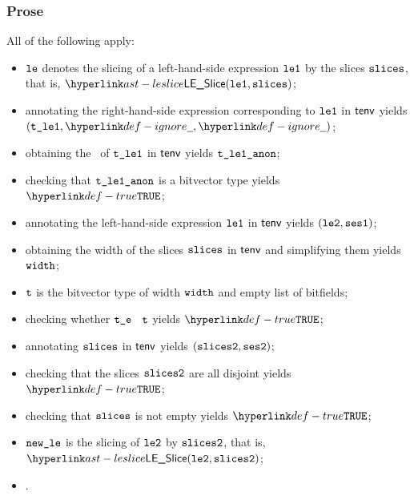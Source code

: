 \subsubsection{Prose}
All of the following apply:
\begin{itemize}
  \item $\texttt{le}$ denotes the slicing of a left-hand-side expression $\texttt{le1}$ by the slices $\texttt{slices}$, that is, $\LESlice(\vleone, \slices)$;
  \item annotating the right-hand-side expression corresponding to $\texttt{le1}$ in $\textsf{tenv}$ yields \\
        $(\vtleone, \Ignore, \Ignore)$\ProseOrTypeError;
  \item obtaining the \underlyingtype\ of $\texttt{t\_le1}$ in $\textsf{tenv}$ yields $\texttt{t\_le1\_anon}$\ProseOrTypeError;
  \item checking that $\texttt{t\_le1\_anon}$ is a bitvector type yields $\True$\ProseTerminateAs{\ExpectedBitvectorType};
  \item annotating the left-hand-side expression $\texttt{le1}$ in $\textsf{tenv}$ yields $(\texttt{le2}, \texttt{ses1})$\ProseOrTypeError;
  \item obtaining the width of the slices $\texttt{slices}$ in $\textsf{tenv}$ and simplifying them yields $\texttt{width}$;
  \item $\texttt{t}$ is the bitvector type of width $\texttt{width}$ and empty list of bitfields;
  \item checking whether $\texttt{t\_e}$ \typesatisfies\ $\texttt{t}$ yields $\True$\ProseOrTypeError;
  \item annotating $\texttt{slices}$ in $\textsf{tenv}$ yields $(\texttt{slices2}, \texttt{ses2})$\ProseOrTypeError;
  \item checking that the slices $\texttt{slices2}$ are all disjoint yields $\True$\ProseOrTypeError;
  \item checking that $\texttt{slices}$ is not empty yields $\True$\ProseTerminateAs{\EmptySlice};
  \item $\texttt{new\_le}$ is the slicing of $\texttt{le2}$ by $\texttt{slices2}$, that is, $\LESlice(\vletwo, \slicestwo)$;
  \item {}.
\end{itemize}
